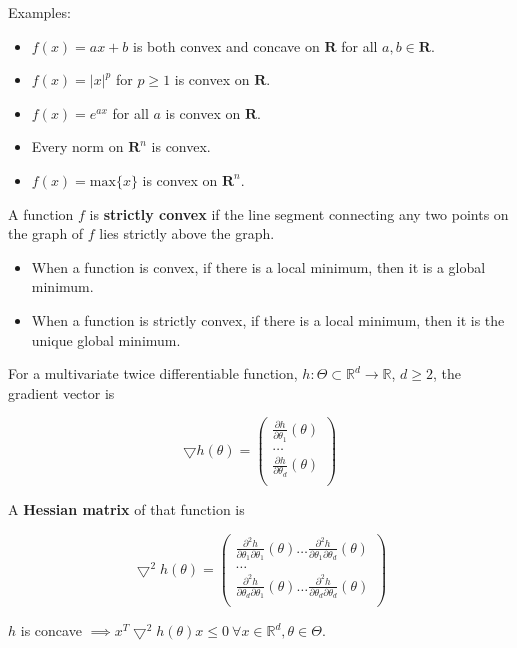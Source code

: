 \documentclass{article}
\begin{document}
Examples:
\begin{itemize}
  \item $f(x) = a x + b$ is both convex and concave on $\mathbf{R}$ for all $a, b \in \mathbf{R}$.
  \item $f(x) = |x|^p$ for $p \geq 1$ is convex on $\mathbf{R}$.
  \item $f(x) = e^{a x}$ for all $a$ is convex on $\mathbf{R}$.
  \item Every norm on $\mathbf{R}^n$ is convex.
  \item $f(x) = \text{max}\{ x \}$ is convex on $\mathbf{R}^n$.
\end{itemize}

A function $f$ is \textbf{strictly convex} if the line segment connecting any two points on the graph of $f$ lies strictly above the graph.

\begin{itemize}
  \item When a function is convex, if there is a local minimum, then it is a global minimum.
  \item When a function is strictly convex, if there is a local minimum, then it is the unique global minimum.
\end{itemize}

For a multivariate twice differentiable function, $h : \Theta \subset \mathbb{R}^d \to \mathbb{R}$, $d \geq 2$, the gradient vector is

$$
\bigtriangledown h(\theta) = 
\begin{pmatrix}
\frac{\partial h}{\partial \theta_1} (\theta) \\
\dots \\
\frac{\partial h}{\partial \theta_d} (\theta) \\
\end{pmatrix}
$$

A \textbf{Hessian matrix} of that function is

$$
\bigtriangledown^2 h(\theta) = 
\begin{pmatrix}
\frac{\partial^2 h}{\partial \theta_1 \partial \theta_1} (\theta) \dots \frac{\partial^2 h}{\partial \theta_1 \partial \theta_d} (\theta) \\
\dots \\
\frac{\partial^2 h}{\partial \theta_d \partial \theta_1} (\theta) \dots \frac{\partial^2 h}{\partial \theta_d \partial \theta_d} (\theta) \\
\end{pmatrix}
$$

$h$ is concave $\implies x^T \bigtriangledown^2 h(\theta) x \leq 0 ~ \forall x \in \mathbb{R}^d, \theta \in \Theta$.
\end{document}
